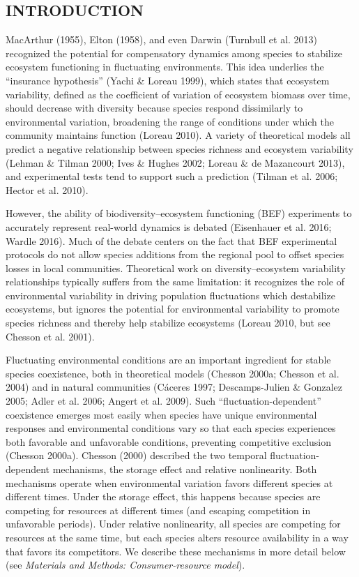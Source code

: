 \documentclass[12pt,]{article}
\begin{document}
\setlength{\parindent}{5ex}

\subsection{INTRODUCTION}\label{introduction}

MacArthur (1955), Elton (1958), and even Darwin (Turnbull et al. 2013)
recognized the potential for compensatory dynamics among species to
stabilize ecosystem functioning in fluctuating environments. This idea
underlies the ``insurance hypothesis'' (Yachi \& Loreau 1999), which
states that ecosystem variability, defined as the coefficient of
variation of ecosystem biomass over time, should decrease with diversity
because species respond dissimilarly to environmental variation,
broadening the range of conditions under which the community maintains
function (Loreau 2010). A variety of theoretical models all predict a
negative relationship between species richness and ecosystem variability
(Lehman \& Tilman 2000; Ives \& Hughes 2002; Loreau \& de Mazancourt
2013), and experimental tests tend to support such a prediction (Tilman
et al. 2006; Hector et al. 2010).

However, the ability of biodiversity--ecosystem functioning (BEF)
experiments to accurately represent real-world dynamics is debated
(Eisenhauer et al. 2016; Wardle 2016). Much of the debate centers on the
fact that BEF experimental protocols do not allow species additions from
the regional pool to offset species losses in local communities.
Theoretical work on diversity--ecosystem variability relationships
typically suffers from the same limitation: it recognizes the role of
environmental variability in driving population fluctuations which
destabilize ecosystems, but ignores the potential for environmental
variability to promote species richness and thereby help stabilize
ecosystems (Loreau 2010, but see Chesson et al. 2001).

Fluctuating environmental conditions are an important ingredient for
stable species coexistence, both in theoretical models (Chesson 2000a;
Chesson et al. 2004) and in natural communities (Cáceres 1997;
Descamps-Julien \& Gonzalez 2005; Adler et al. 2006; Angert et al.
2009). Such ``fluctuation-dependent'' coexistence emerges most easily
when species have unique environmental responses and environmental
conditions vary so that each species experiences both favorable and
unfavorable conditions, preventing competitive exclusion (Chesson
2000a). Chesson (2000) described the two temporal fluctuation-dependent
mechanisms, the storage effect and relative nonlinearity. Both
mechanisms operate when environmental variation favors different species
at different times. Under the storage effect, this happens because
species are competing for resources at different times (and escaping
competition in unfavorable periods). Under relative nonlinearity, all
species are competing for resources at the same time, but each species
alters resource availability in a way that favors its competitors. We
describe these mechanisms in more detail below (see
\emph{Materials and Methods: Consumer-resource model}).
\end{document}
